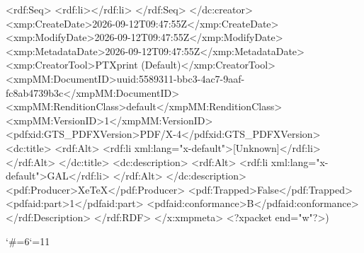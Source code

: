 {          <rdf:Seq>
            <rdf:li></rdf:li>
          </rdf:Seq>
        </dc:creator>
        <xmp:CreateDate>2026-09-12T09:47:55Z</xmp:CreateDate>
        <xmp:ModifyDate>2026-09-12T09:47:55Z</xmp:ModifyDate>
        <xmp:MetadataDate>2026-09-12T09:47:55Z</xmp:MetadataDate>
        <xmp:CreatorTool>PTXprint (Default)</xmp:CreatorTool>
        <xmpMM:DocumentID>uuid:5589311-bbc3-4ac7-9aaf-fc8ab4739b3c</xmpMM:DocumentID>
        <xmpMM:RenditionClass>default</xmpMM:RenditionClass>
        <xmpMM:VersionID>1</xmpMM:VersionID>
        <pdfxid:GTS_PDFXVersion>PDF/X-4</pdfxid:GTS_PDFXVersion>
        <dc:title>
          <rdf:Alt>
            <rdf:li xml:lang="x-default">[Unknown]</rdf:li>
          </rdf:Alt>
        </dc:title>
        <dc:description>
          <rdf:Alt>
            <rdf:li xml:lang="x-default">GAL</rdf:li>
          </rdf:Alt>
        </dc:description>
        <pdf:Producer>XeTeX</pdf:Producer>
        <pdf:Trapped>False</pdf:Trapped>
      <pdfaid:part>1</pdfaid:part>
      <pdfaid:conformance>B</pdfaid:conformance>
      </rdf:Description>
  </rdf:RDF>
</x:xmpmeta>
<?xpacket end="w"?>)}
\egroup
\catcode`\#=6\catcode`\@=11 \activ@tecustomch@rs







